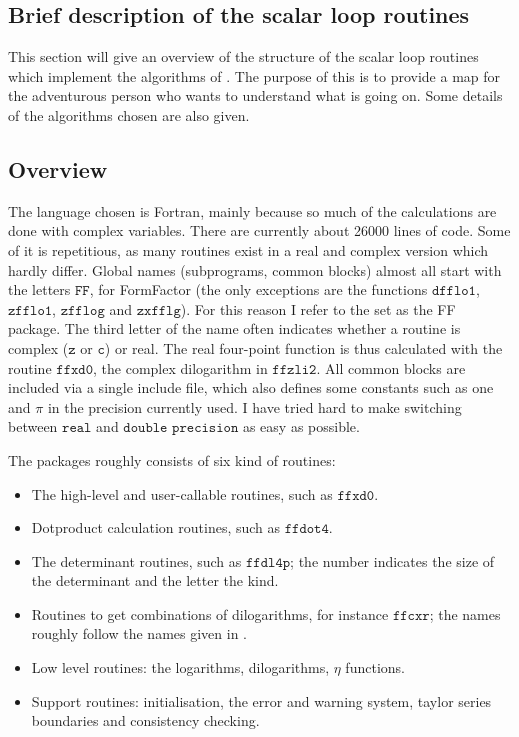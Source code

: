\documentclass[twoside,12pt]{report}
\def\Code#1{\ensuremath{\texttt{#1}}}
\begin{document}
\begin{appendix}
\section{Brief description of the scalar loop routines}
\label{ap:FFdescription}

This section will give an overview of the structure of the scalar loop 
routines which implement the algorithms of \cite{vOV90}.  The purpose 
of this is to provide a map for the adventurous person who wants to understand 
what is going on.  Some details of the algorithms chosen are also given.

\subsection{Overview}

The language chosen is Fortran, mainly because so much of the 
calculations are done with complex variables.  There are currently about 
26000 lines of code.  Some of it is repetitious, as many routines exist 
in a real and complex version which hardly differ.  Global names 
(subprograms, common blocks) almost all start with the letters 
\Code{FF}, for FormFactor (the only exceptions are the functions 
\Code{dfflo1}, \Code{zfflo1}, \Code{zfflog} and \Code{zxfflg}). For this 
reason I refer to the set as the FF package.  The third letter of the 
name often indicates whether a routine is complex (\Code{z} or \Code{c}) 
or real. The real four-point function is thus calculated with the 
routine \Code{ffxd0}, the complex dilogarithm in \Code{ffzli2}.  All 
common blocks are included via a single include file, which also defines 
some constants such as one and $\pi$ in the precision currently used.  I 
have tried hard to make switching between \Code{real} and \Code{double 
precision} as easy as possible.

The packages roughly consists of six kind of routines:
\begin{itemize}
\item The high-level and user-callable routines, such as \Code{ffxd0}.
\item Dotproduct calculation routines, such as \Code{ffdot4}.
\item The determinant routines, such as \Code{ffdl4p}; the number indicates 
  the size of the determinant and the letter the kind.
\item Routines to get combinations of dilogarithms, for instance
  \Code{ffcxr}; the names roughly follow the names given in \cite{vOV90}.
\item Low level routines: the logarithms, dilogarithms, $\eta$ functions.
\item Support routines: initialisation, the error and warning system, taylor 
series boundaries and consistency checking.
\end{itemize}


\end{appendix}
\end{document}
